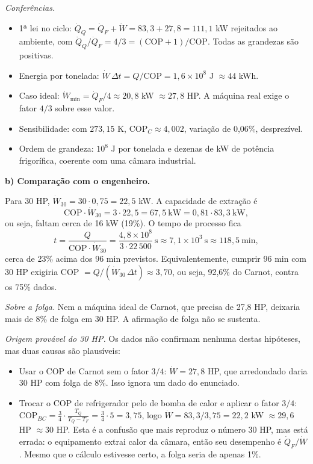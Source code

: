 \documentclass{article}%
\begin{document}
\textit{Conferências.}
\begin{itemize}
\item 1ª lei no ciclo: $\dot Q_Q = \dot Q_F + \dot W = 83{,}3 + 27{,}8 = 111{,}1$ kW rejeitados ao ambiente, com $\dot Q_Q/\dot Q_F = 4/3 = (\text{COP}+1)/\text{COP}$. Todas as grandezas são positivas.
\item Energia por tonelada: $\dot W\,\Delta t = Q/\text{COP} = 1{,}6\times10^{8}$ J $\approx 44$ kWh.
\item Caso ideal: $\dot W_{\min} = \dot Q_F/4 \approx 20{,}8$ kW $\approx 27{,}8$ HP. A máquina real exige o fator $4/3$ sobre esse valor.
\item Sensibilidade: com $273{,}15$ K, $\text{COP}_C \approx 4{,}002$, variação de 0,06\%, desprezível.
\item Ordem de grandeza: $10^{8}$ J por tonelada e dezenas de kW de potência frigorífica, coerente com uma câmara industrial.
\end{itemize}

\textbf{b) Comparação com o engenheiro.}

Para 30 HP, $\dot W_{30} = 30\cdot 0{,}75 = 22{,}5$ kW. A capacidade de extração é
\[
\text{COP}\cdot\dot W_{30} = 3\cdot 22{,}5 = 67{,}5\ \text{kW} = 0{,}81\cdot 83{,}3\ \text{kW},
\]
ou seja, faltam cerca de 16 kW (19\%). O tempo de processo fica
\[
t = \frac{Q}{\text{COP}\cdot\dot W_{30}} = \frac{4{,}8\times10^{8}}{3\cdot 22\,500}\ \text{s} \approx 7{,}1\times10^{3}\ \text{s} \approx 118{,}5\ \text{min},
\]
cerca de 23\% acima dos 96 min previstos. Equivalentemente, cumprir 96 min com 30 HP exigiria COP $= Q/(\dot W_{30}\,\Delta t) \approx 3{,}70$, ou seja, 92,6\% do Carnot, contra os 75\% dados.

\textit{Sobre a folga.} Nem a máquina ideal de Carnot, que precisa de 27,8 HP, deixaria mais de 8\% de folga em 30 HP. A afirmação de folga não se sustenta.

\textit{Origem provável do 30 HP.} Os dados não confirmam nenhuma destas hipóteses, mas duas causas são plausíveis:
\begin{itemize}
\item Usar o COP de Carnot sem o fator $3/4$: $\dot W = 27{,}8$ HP, que arredondado daria 30 HP com folga de 8\%. Isso ignora um dado do enunciado.
\item Trocar o COP de refrigerador pelo de bomba de calor e aplicar o fator $3/4$: $\text{COP}_{BC} = \tfrac{3}{4}\cdot\tfrac{T_Q}{T_Q-T_F} = \tfrac{3}{4}\cdot 5 = 3{,}75$, logo $\dot W = 83{,}3/3{,}75 = 22{,}2$ kW $\approx 29{,}6$ HP $\approx 30$ HP. Esta é a confusão que mais reproduz o número 30 HP, mas está errada: o equipamento extrai calor da câmara, então seu desempenho é $\dot Q_F/\dot W$. Mesmo que o cálculo estivesse certo, a folga seria de apenas 1\%.
\end{itemize}
\end{document}
